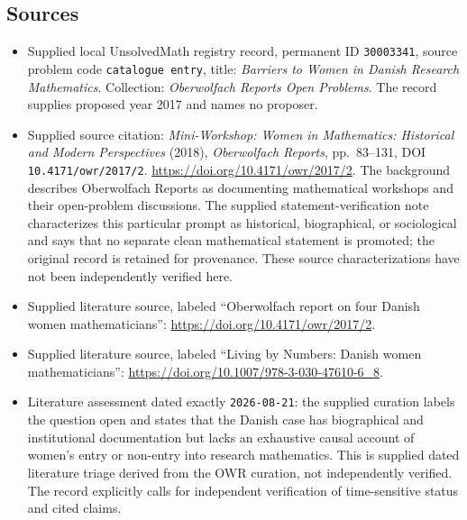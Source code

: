 \documentclass[11pt]{article}
\begin{document}
\subsection{Sources}
\begin{itemize}
\item Supplied local UnsolvedMath registry record, permanent ID \texttt{30003341}, source problem code \texttt{catalogue entry}, title: \emph{Barriers to Women in Danish Research Mathematics}. Collection: \emph{Oberwolfach Reports Open Problems}. The record supplies proposed year 2017 and names no proposer.
\item Supplied source citation: \emph{Mini-Workshop: Women in Mathematics: Historical and Modern Perspectives} (2018), \emph{Oberwolfach Reports}, pp.\ 83--131, DOI \texttt{10.4171/owr/2017/2}. \url{https://doi.org/10.4171/owr/2017/2}. The background describes Oberwolfach Reports as documenting mathematical workshops and their open-problem discussions. The supplied statement-verification note characterizes this particular prompt as historical, biographical, or sociological and says that no separate clean mathematical statement is promoted; the original record is retained for provenance. These source characterizations have not been independently verified here.
\item Supplied literature source, labeled ``Oberwolfach report on four Danish women mathematicians'': \url{https://doi.org/10.4171/owr/2017/2}.
\item Supplied literature source, labeled ``Living by Numbers: Danish women mathematicians'': \url{https://doi.org/10.1007/978-3-030-47610-6_8}.
\item Literature assessment dated exactly \texttt{2026-08-21}: the supplied curation labels the question open and states that the Danish case has biographical and institutional documentation but lacks an exhaustive causal account of women's entry or non-entry into research mathematics. This is supplied dated literature triage derived from the OWR curation, not independently verified. The record explicitly calls for independent verification of time-sensitive status and cited claims.
\end{itemize}
\end{document}
